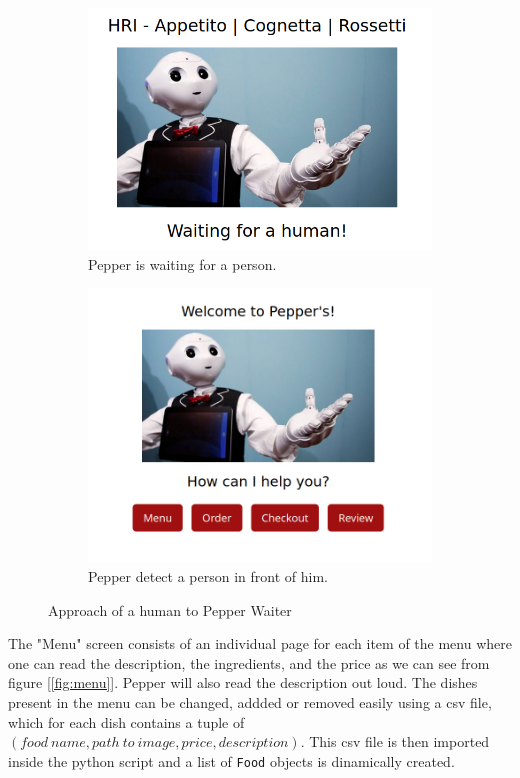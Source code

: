 \documentclass[12pt, letterpaper, twoside]{article}
\begin{document}
\begin{figure}[h]
	\centering
	\begin{subfigure}{.5\textwidth}
	  \centering
	  \includegraphics[width=1\linewidth]{img/waiting_human.png}
	  \caption{Pepper is waiting for a person.}
	  \label{fig:wait_human}
	\end{subfigure}%
	\begin{subfigure}{.5\textwidth}
	  \centering
	  \includegraphics[width=.9\linewidth]{img/menu.png}
	  \caption{Pepper detect a person in front of him.}
	  \label{fig:human_arrived}
	\end{subfigure}
	\caption{Approach of a human to Pepper Waiter}
	\label{fig:approach_person}
\end{figure}

The "Menu" screen consists of an individual page for each item of the menu where one can read the description, the ingredients, and the price as we can see from figure [\ref{fig:menu}]. Pepper will also read the description out loud. The dishes present in the menu can be changed, addded or removed easily using a csv file, which for each dish contains a tuple of $(food\ name, path\ to\ image, price, description)$. This csv file is then imported inside the python script and a list of \verb|Food| objects is dinamically created.\\
\end{document}
